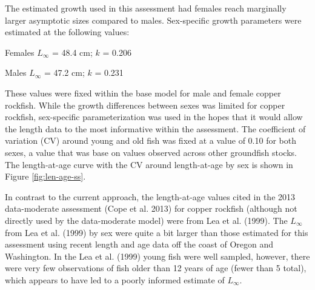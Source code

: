 \documentclass[11pt,
  english,
  a4paper,
]{article}
\begin{document}
\leavevmode\tagmcend\tagstructend\par


The estimated growth used in this assessment had females reach marginally larger asymptotic sizes compared to males. Sex-specific growth parameters were estimated at the following values:

\leavevmode\tagmcend\tagstructend\par

\begin{centering}

Females $L_{\infty}$ = 48.4 cm; $k$ = 0.206

Males $L_{\infty}$ = 47.2 cm; $k$ = 0.231

\end{centering}

\vspace{0.5cm}


These values were fixed within the base model for male and female copper rockfish. While the growth differences between sexes was limited for copper rockfish, sex-specific parameterization was used in the hopes that it would allow the length data to the most informative within the assessment. The coefficient of variation (CV) around young and old fish was fixed at a value of 0.10 for both sexes, a value that was base on values observed across other groundfish stocks. The length-at-age curve with the CV around length-at-age by sex is shown in Figure \ref{fig:len-age-ss}.

\leavevmode\tagmcend\tagstructend\par


In contrast to the current approach, the length-at-age values cited in the 2013 data-moderate assessment {(Cope et al. 2013)\leavevmode\tagmcend\tagstructend} for copper rockfish (although not directly used by the data-moderate model) were from Lea et al. {(1999)\leavevmode\tagmcend\tagstructend}. The {\(L_{\infty}\)\leavevmode\tagmcend\tagstructend} from Lea et al. {(1999)\leavevmode\tagmcend\tagstructend} by sex were quite a bit larger than those estimated for this assessment using recent length and age data off the coast of Oregon and Washington. In the Lea et al. {(1999)\leavevmode\tagmcend\tagstructend} young fish were well sampled, however, there were very few observations of fish older than 12 years of age (fewer than 5 total), which appears to have led to a poorly informed estimate of {\(L_{\infty}\)\leavevmode\tagmcend\tagstructend}.
\end{document}
